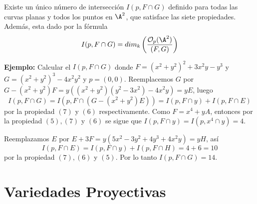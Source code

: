 \documentclass{article}
\begin{document}
\begin{teo}
    Existe un único número de intersección $I(p,F\cap G)$ definido para todas las curvas planas y
    todos los puntos en $\A^{2}$, que satisface las siete propiedades. Además, esta dado por la
    fórmula
    \begin{equation*}
        I(p,F\cap G)=dim_{k}\left(\frac{\mathcal{O}_{p}(\A^{2})}{(F,G)}\right)
    \end{equation*}
\end{teo}
\noindent\textbf{Ejemplo:} Calcular el $I(p,F\cap G)$ donde $F=(x^{2}+y^{2})^{2}+3x^{2}y-y^{3}$ y
$G=(x^{2}+y^{2})^{3}-4x^{2}y^{2}$ y $p=(0,0)$. Reemplacemos $G$ por $G-(x^{2}+y^{2})F
=y((x^{2}+y^{2})(y^{2}-3x^{2})-4x^{2}y)=yE$, luego
\begin{equation*}
    I(p,F\cap G)=I(p,F\cap(G-(x^{2}+y^{2})E))=I(p,F\cap y)+I(p,F\cap E)
\end{equation*}
por la propiedad $(7)$ y $(6)$ respectivamente. Como $F=x^{4}+yA$, entonces por la propiedad 
$(5), (7)$ y $(6)$ se sigue que $I(p,F\cap y)=I(p,x^{4}\cap y)=4$.

\vspace{4mm}
\noindent Reemplazamos $E$ por $E+3F=y(5x^{2}-3y^{2}+4y^{3}+4x^{2}y)=yH$, así
\begin{equation*}
    I(p,F\cap E)=I(p,F\cap y)+I(p,F\cap H)=4+6=10
\end{equation*}
por la propiedad $(7), (6)$ y $(5)$. Por lo tanto $I(p,F\cap G)=14$.
\newpage

\section{Variedades Proyectivas}
\end{document}
